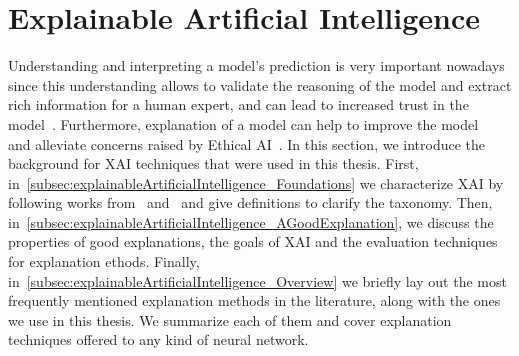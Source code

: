 \section{Explainable Artificial Intelligence}
\label{sec:explainableArtificialIntelligence}
Understanding and interpreting a model's prediction is very important nowadays since this understanding allows to validate the reasoning of the model and extract rich information for a human expert, and can lead to increased trust in the model~\parencite{WhyShouldITrustYou_Riberio}. Furthermore, explanation of a model can help to improve the model~\parencite{AUnifiedApproach_Lundberg} and alleviate concerns raised by Ethical AI~\parencite{MachineBias_Angwin, EURegulationsOnDecisionMaking_Goodman}.
In this section, we introduce the background for XAI techniques that were used in this thesis. First, in~\ref{subsec:explainableArtificialIntelligence_Foundations} we characterize XAI by following works from~\cite{TheMythosOfModelInterpretability_Lipton} and~\cite{XAIConceptsTaxonomies_Arrieta} and give definitions to clarify the taxonomy. Then, in~\ref{subsec:explainableArtificialIntelligence_AGoodExplanation}, we discuss the properties of good explanations, the goals of XAI and the evaluation techniques for explanation ethods. Finally, in~\ref{subsec:explainableArtificialIntelligence_Overview} we briefly lay out the most frequently mentioned explanation methods in the literature, along with the ones we use in this thesis. We summarize each of them and cover explanation techniques offered to any kind of neural network.

